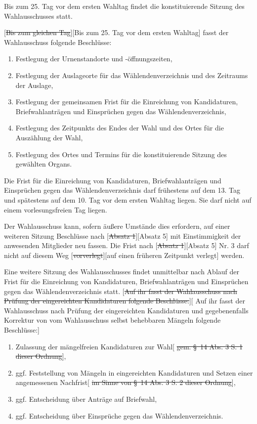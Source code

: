 \documentclass[%
draft,%
multilinesections%
]{fswo}
\newcommand\oldT[1]  {{\color{Gray}[\st{#1}]}}
\newcommand\newT[1]  {{\color{Green}[#1]}}
\newcommand\oldT[1]{}%
\newcommand\newT[1]{#1}
\newcommand\change[2]{\oldT{#1}\newT{#2}}
\begin{document}
\begin{contract}
Bis zum 25. Tag vor dem ersten Wahltag findet die konstituierende Sitzung des Wahlausschusses statt.

\change{Bis zum gleichen Tag}{Bis zum 25. Tag vor dem ersten Wahltag} fasst der Wahlausschuss folgende Beschlüsse:
\begin{enumerate}
\item Festlegung der Urnenstandorte und -öffnungszeiten,
\item Festlegung der Auslageorte für das Wählendenverzeichnis und des Zeitraums der Auslage,
\item Festlegung der gemeinsamen Frist für die Einreichung von Kandidaturen, Briefwahlanträgen und Einsprüchen gegen das Wählendenverzeichnis,
\item Festlegung des Zeitpunkts des Endes der Wahl und des Ortes für die Auszählung der Wahl,
\item Festlegung des Ortes und Termins für die konstituierende Sitzung des gewählten Organs.
\end{enumerate}
Die Frist für die Einreichung von Kandidaturen, Briefwahlanträgen und Einsprüchen gegen das Wählendenverzeichnis darf frühestens auf dem 13. Tag und spätestens auf dem 10. Tag vor dem ersten Wahltag liegen.
Sie darf nicht auf einem vorlesungsfreien Tag liegen.

Der Wahlausschuss kann, sofern äußere Umstände dies erfordern, auf einer weiteren Sitzung Beschlüsse nach \change{Absatz 1}{Absatz 5} mit Einstimmigkeit der anwesenden Mitglieder neu fassen.
Die Frist nach \change{Absatz 1}{Absatz 5} Nr. 3 darf nicht auf diesem Weg \change{vorverlegt}{auf einen früheren Zeitpunkt verlegt} werden.

Eine weitere Sitzung des Wahlausschusses findet unmittelbar nach Ablauf der Frist für die Einreichung von Kandidaturen, Briefwahlanträgen und Einsprüchen gegen das Wählendenverzeichnis statt.
\change{Auf ihr fasst der Wahlausschuss nach Prüfung der eingereichten Kandidaturen folgende Beschlüsse:}{%
Auf ihr fasst der Wahlausschuss nach Prüfung der eingereichten Kandidaturen und gegebenenfalls Korrektur von vom Wahlausschuss selbst behebbaren Mängeln folgende Beschlüsse:}
\begin{enumerate}
\item Zulassung der mängelfreien Kandidaturen zur Wahl\oldT{ gem. \S~14 Abs. 3 S. 1 dieser Ordnung},
\item ggf. Feststellung von Mängeln in eingereichten Kandidaturen und Setzen einer angemessenen Nachfrist\oldT{ im Sinne von \S~14 Abs. 3 S. 2 dieser Ordnung},
\item ggf. Entscheidung über Anträge auf Briefwahl,
\item ggf. Entscheidung über Einsprüche gegen das Wählendenverzeichnis.
\end{enumerate}


\end{contract}
\end{document}
